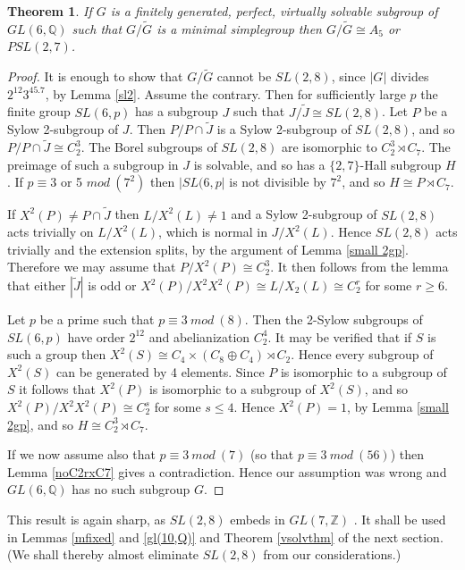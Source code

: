 \documentclass[12pt]{amsart}
\renewcommand{\geq}{\geqslant}
\renewcommand{\leq}{\leqslant}
\newtheorem{theorem}{Theorem}
\begin{document}
\begin{theorem}
\label{no sl(2,8)}
If $G$ is a finitely generated, perfect, virtually solvable subgroup of $GL(6,\mathbb{Q})$
such that $G/\widetilde{G}$ is a minimal simplegroup
then $G/\widetilde{G}\cong{A_5}$ or $PSL(2,7)$.
\end{theorem}

\begin{proof}
It is enough to show that $G/\widetilde{G}$ cannot be $SL(2,8)$,
since $|G|$ divides $2^{12}3^45.7$, by Lemma \ref{sl2}.
Assume the contrary.
Then for sufficiently large $p$ the finite group $SL(6,p)$ has a subgroup $J$ 
such that $J/\widetilde{J}\cong{SL(2,8)}$.
Let $P$ be a Sylow 2-subgroup of $J$.
Then $P/P\cap\widetilde{J}$ is a Sylow 2-subgroup of $SL(2,8)$,
and so $P/P\cap\widetilde{J}\cong{C_2^3}$.
The Borel subgroups of $SL(2,8)$ are isomorphic to $C_2^3\rtimes{C_7}$.
The preimage of such a subgroup in $J$ is solvable, 
and so has a $\{2,7\}$-Hall subgroup $H$.
If $p\equiv3$ or 5 $mod~(7^2)$ then $|SL(6,p|$ is not divisible by $7^2$,
and so $H\cong{P}\rtimes{C_7}$.

If $X^2(P)\not=P\cap\widetilde{J}$ then $L/X^2(L)\not=1$ and
a Sylow 2-subgroup of $SL(2,8)$ acts trivially on $L/X^2(L)$,
which is normal in $J/X^2(L)$.
Hence $SL(2,8)$ acts trivially and the extension splits,
by the argument of Lemma \ref{small 2gp}.
Therefore we may assume that $P/X^2(P)\cong{C_2^3}$.
It then follows from the lemma that either $|\widetilde{J}|$ is odd or 
$X^2(P)/X^2X^2(P)\cong{L/X_2(L)}\cong{C_2^r}$ for some $r\geq6$.

Let $p$ be a prime such that $p\equiv3~mod~(8)$. 
Then the 2-Sylow subgroups of $SL(6,p)$ have order $2^{12}$ and 
abelianization $C_2^4$.
It may be verified that if $S$ is such a group then
$X^2(S)\cong{C_4}\times(C_8\oplus{C_4})\rtimes{C_2}$.
Hence every subgroup of $X^2(S)$ can be generated by 4 elements.
Since $P$ is isomorphic to a subgroup of $S$ it follows that 
$X^2(P)$ is isomorphic to a subgroup of $X^2(S)$,
and so $X^2(P)/X^2X^2(P)\cong{C_2^s}$ for some $s\leq4$.
Hence $X^2(P)=1$, by Lemma \ref{small 2gp},
and so $H\cong{C_2^3\rtimes{C_7}}$.

If we now assume also that $p\equiv3~mod~(7)$
(so that $p\equiv3~mod~(56)$) 
then Lemma \ref{noC2rxC7} gives a contradiction.
Hence our assumption was wrong and $GL(6,\mathbb{Q})$ has no such subgroup $G$.
\end{proof}

This result is again sharp, as $SL(2,8)$ embeds in $GL(7,\mathbb{Z})$ \cite{HP}.
It shall be used in Lemmas \ref{mfixed} and \ref{gl(10,Q)}
and Theorem  \ref{vsolvthm} of the next section.
(We shall thereby almost eliminate $SL(2,8)$ from our considerations.)
\end{document}
